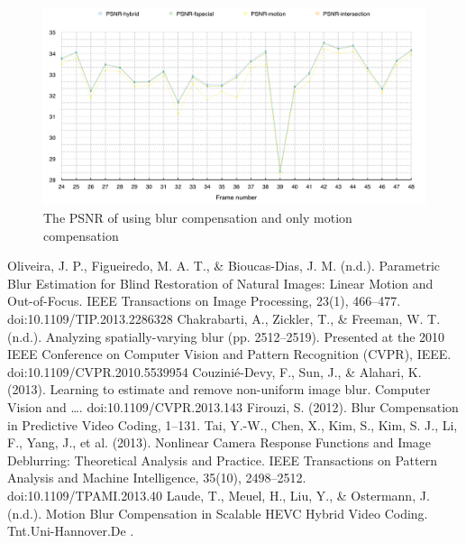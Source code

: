 \documentclass{article}
\begin{document}
\begin{figure}
 \centering
   \includegraphics[width=6in]{psnr.png} 
   \caption{The PSNR of using blur compensation and only motion compensation}
   \label{psnr}
\end{figure}

\begin{thebibliography}{99}
Oliveira, J. P., Figueiredo, M. A. T., \& Bioucas-Dias, J. M. (n.d.). Parametric Blur Estimation for Blind Restoration of Natural Images: Linear Motion and Out-of-Focus. IEEE Transactions on Image Processing, 23(1), 466–477. doi:10.1109/TIP.2013.2286328
Chakrabarti, A., Zickler, T., \& Freeman, W. T. (n.d.). Analyzing spatially-varying blur (pp. 2512–2519). Presented at the 2010 IEEE Conference on Computer Vision and Pattern Recognition (CVPR), IEEE. doi:10.1109/CVPR.2010.5539954
Couzinié-Devy, F., Sun, J., \& Alahari, K. (2013). Learning to estimate and remove non-uniform image blur. Computer Vision and …. doi:10.1109/CVPR.2013.143
Firouzi, S. (2012). Blur Compensation in Predictive Video Coding, 1–131.
Tai, Y.-W., Chen, X., Kim, S., Kim, S. J., Li, F., Yang, J., et al. (2013). Nonlinear Camera Response Functions and Image Deblurring: Theoretical Analysis and Practice. IEEE Transactions on Pattern Analysis and Machine Intelligence, 35(10), 2498–2512. doi:10.1109/TPAMI.2013.40
Laude, T., Meuel, H., Liu, Y., \& Ostermann, J. (n.d.). Motion Blur Compensation in Scalable HEVC Hybrid Video Coding. Tnt.Uni-Hannover.De
. 
\end{thebibliography}
\end{document}
